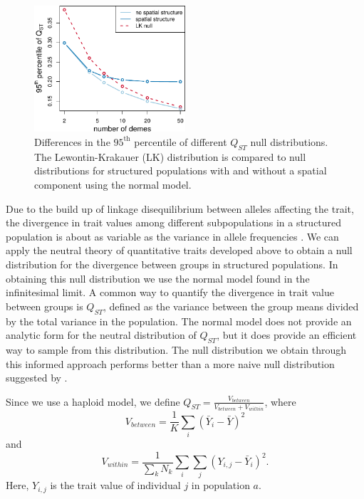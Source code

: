 \begin{figure}
  \centering
  \includegraphics[width=0.5\textwidth]{figures/qst_deme_percentile_nospace.pdf}
  \caption{\small Differences in the $95^{\mathrm{th}}$ percentile of different
    $Q_{ST}$ null distributions. The Lewontin-Krakauer (LK) distribution is
    compared to null distributions for structured populations with and without a
    spatial component using the normal model.}
  \label{fig:qst_perc}
\end{figure}

Due to the build up of linkage disequilibrium between alleles affecting the
trait, the divergence in trait values among different subpopulations in a
structured population is about as variable as the variance in allele frequencies
\citep{Rogers1983}. We can apply the neutral theory of quantitative traits
developed above to obtain a null distribution for the divergence between groups
in structured populations. In obtaining this null distribution we use the normal
model found in the infinitesimal limit. A common way to quantify the divergence
in trait value between groups is $Q_{ST}$, defined as the variance between the
group means divided by the total variance in the population. The normal model
does not provide an analytic form for the neutral distribution of $Q_{ST}$, but
it does provide an efficient way to sample from this distribution. The null
distribution we obtain through this informed approach performs better than a
more naive null distribution suggested by \citet{Whitlock2009}.

Since we use a haploid model, we define $Q_{ST} = \frac{V_{between}}{V_{between}
  + V_{within}}$, where
\begin{equation*}
  V_{between} = \frac{1}{K} \sum_i \left( \bar{Y}_i - \bar{Y} \right)^2
\end{equation*}
and
\begin{equation*}
  V_{within} = \frac{1}{\sum_k N_k} \sum_i \sum_j \left( Y_{i,j} - \bar{Y}_i \right)^2.
\end{equation*}
Here, $Y_{i,j}$ is the trait value of individual $j$ in population $a$.

